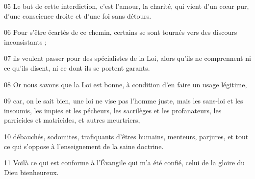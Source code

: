 
05 Le but de cette interdiction, c’est l’amour, la charité, qui vient d’un cœur pur, d’une conscience droite et d’une foi sans détours.

06 Pour s’être écartés de ce chemin, certains se sont tournés vers des discours inconsistants ;

07 ils veulent passer pour des spécialistes de la Loi, alors qu’ils ne comprennent ni ce qu’ils disent, ni ce dont ils se portent garants.

08 Or nous savons que la Loi est bonne, à condition d’en faire un usage légitime,

09 car, on le sait bien, une loi ne vise pas l’homme juste, mais les sans-loi et les insoumis, les impies et les pécheurs, les sacrilèges et les profanateurs, les parricides et matricides, et autres meurtriers,

10 débauchés, sodomites, trafiquants d’êtres humains, menteurs, parjures, et tout ce qui s’oppose à l’enseignement de la saine doctrine.

11 Voilà ce qui est conforme à l’Évangile qui m’a été confié, celui de la gloire du Dieu bienheureux.
